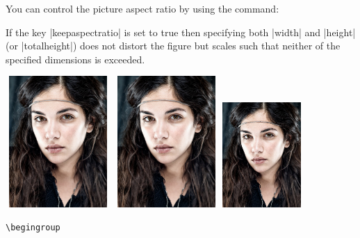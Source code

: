 You can control the picture aspect ratio by using the command:

\begin{commands}[]{}
\end{commands}

If the key |keepaspectratio| is set to true then specifying 
both |width| and |height| (or |totalheight|) does not distort the ﬁgure but 
scales such that neither of the speciﬁed dimensions is exceeded.

\medskip
\begin{commands}[]{}
\begingroup

\centering
\includegraphics[width=0.3\textwidth, height=5cm]{./images/amato.jpg}
\includegraphics[keepaspectratio=true,width=4cm, height=5cm]{./images/amato.jpg}
\includegraphics[width=3cm]{./images/amato.jpg}

\endgroup

\begin{verbatim}
\begingroup


\end{verbatim}
\end{commands}
